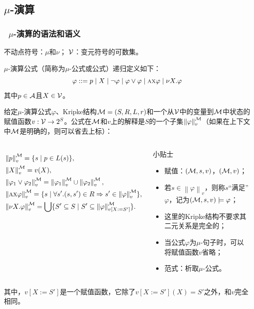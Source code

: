 \documentclass[aspectratio=1610, 9pt, CJK]{beamer}
\begin{document}
\subsection{$\mu$-演算}
\begin{frame} 
	\frametitle{~$\mu$-演算的语法和语义}
	{\footnotesize 
		不动点符号：$\mu$和$\nu$；\qquad
		${\cal V}$：变元符号的可数集。 
		\begin{definition}[$\mu$-演算公式]
			$\mu$-演算公式（简称为$\mu$-公式或公式）递归定义如下：
			\[
			\varphi ::=   p\mid  X\mid \neg \varphi\mid \varphi \vee \varphi \mid \textsc{a}\textsc{x} \varphi\mid  \nu X. \varphi
			\]
			其中$p\in {\cal A}$且$X\in {\cal V}$。
		\end{definition}
		\begin{definition}
			给定$\mu$-演算公式$\varphi$、Kripke结构{\em ${\cal M}=(S,R,L,r)$}和一个从${\cal V}$中的变量到${\cal M}$中状态的赋值函数$v: {\cal V} \rightarrow 2^S$。公式在${\cal M}$和$v$上的解释是$S$的一个子集$\left\| \varphi\right\|_v^{{\cal M}}$（如果在上下文中${\cal M}$是明确的，则可以省去上标）：
			\begin{columns}
				\begin{align*}
					& \left \| p\right \|_v^{{\cal M}} = \{s\mid p \in L(s)\}, \\  
					& \left\| X\right\|_v^{{\cal M}} = v(X),\\
					& \left\|\varphi_1 \vee \varphi_2\right\|_v^{{\cal M}} = \left\|\varphi_1\right\|_v^{{\cal M}} \cup \left\|\varphi_2\right\|_v^{{\cal M}},\\ 
					& \left\|\textsc{a} \textsc{x} \varphi\right\|_v^{{\cal M}} = \{s\mid \forall s'. (s, s') \in R \Rightarrow s' \in \left\|\varphi\right\|_v^{{\cal M}}\},\\ 
					& \left\| \nu X. \varphi\right\|_v^{{\cal M}} = \bigcup\{S' \subseteq S \mid S' \subseteq \left\|\varphi\right\|_{v[X:= S']}^{{\cal M}}\}.
				\end{align*}
				{\tiny 
					\begin{block}{{\scriptsize 小贴士}}
						\begin{itemize} 
							\item 赋值：$({\cal M},s,v)$，$({\cal M},v)$；
							\item 若$s\in \left\| \varphi \right\|_v$，则称$s$“满足”$\varphi$，记为$({\cal M}, s, v) \models \varphi$；
							\item 这里的Kripke结构不要求其二元关系是完全的；
							\item 当公式$\varphi$为$\mu$-句子时，可以将赋值函数$v$省略；
							\item 范式：析取$\mu$-公式。
						\end{itemize}
					\end{block}
				} 
			\end{columns}
			
			其中，$v[X:= S']$是一个赋值函数，它除了$v[X:= S'](X)=S'$之外，和$v$完全相同。
		\end{definition}
		 
	}
\end{frame}
\end{document}
